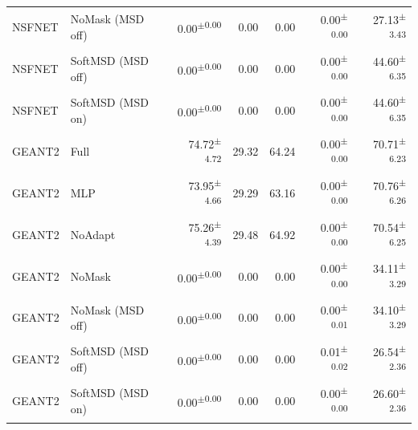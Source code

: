 \documentclass[final,5p]{elsarticle}
\begin{document}
\begin{table}[t]
\begin{tabular}{llrrrrr}
NSFNET & NoMask (MSD off) & 0.00\textsuperscript{$\pm$0.00} & 0.00 & 0.00 & 0.00\textsuperscript{$\pm$0.00} & 27.13\textsuperscript{$\pm$3.43} \\
NSFNET & SoftMSD (MSD off) & 0.00\textsuperscript{$\pm$0.00} & 0.00 & 0.00 & 0.00\textsuperscript{$\pm$0.00} & 44.60\textsuperscript{$\pm$6.35} \\
NSFNET & SoftMSD (MSD on) & 0.00\textsuperscript{$\pm$0.00} & 0.00 & 0.00 & 0.00\textsuperscript{$\pm$0.00} & 44.60\textsuperscript{$\pm$6.35} \\
GEANT2 & Full & 74.72\textsuperscript{$\pm$4.72} & 29.32 & 64.24 & 0.00\textsuperscript{$\pm$0.00} & 70.71\textsuperscript{$\pm$6.23} \\
GEANT2 & MLP & 73.95\textsuperscript{$\pm$4.66} & 29.29 & 63.16 & 0.00\textsuperscript{$\pm$0.00} & 70.76\textsuperscript{$\pm$6.26} \\
GEANT2 & NoAdapt & 75.26\textsuperscript{$\pm$4.39} & 29.48 & 64.92 & 0.00\textsuperscript{$\pm$0.00} & 70.54\textsuperscript{$\pm$6.25} \\
GEANT2 & NoMask & 0.00\textsuperscript{$\pm$0.00} & 0.00 & 0.00 & 0.00\textsuperscript{$\pm$0.00} & 34.11\textsuperscript{$\pm$3.29} \\
GEANT2 & NoMask (MSD off) & 0.00\textsuperscript{$\pm$0.00} & 0.00 & 0.00 & 0.00\textsuperscript{$\pm$0.01} & 34.10\textsuperscript{$\pm$3.29} \\
GEANT2 & SoftMSD (MSD off) & 0.00\textsuperscript{$\pm$0.00} & 0.00 & 0.00 & 0.01\textsuperscript{$\pm$0.02} & 26.54\textsuperscript{$\pm$2.36} \\
GEANT2 & SoftMSD (MSD on) & 0.00\textsuperscript{$\pm$0.00} & 0.00 & 0.00 & 0.00\textsuperscript{$\pm$0.00} & 26.60\textsuperscript{$\pm$2.36} \\

\bottomrule
\end{tabular}
\end{table}
\end{document}
